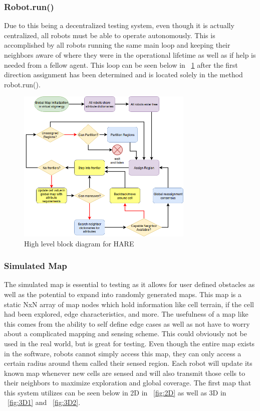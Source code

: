 \subsubsection{Robot.run()}

Due to this being a decentralized testing system, even though it is actually
centralized, all robots must be able to operate autonomously. This is accomplished
by all robots running the same main loop and keeping their neighbors aware of where they were
in the operational lifetime as well as if help is needed from a fellow agent. This loop can be seen
below in ~\ref{fig:HARE} after the first direction assignment has been determined and is
located solely in the method robot.run().


\begin{figure}[H]
  \centering
    \includegraphics[width=0.75\textwidth]{HARE}
  \caption{High level block diagram for HARE}
  \label{fig:HARE}
\end{figure}

\subsubsection{Simulated Map}

The simulated map is essential to testing as it allows for user defined obstacles as well as the
potential to expand into randomly generated maps. This map is a static NxN array of map nodes which
hold information like cell terrain, if the cell had been explored, edge characteristics, and more.
The usefulness of a map like this comes from the ability to self define edge cases as well as not
have to worry about a complicated mapping and sensing scheme. This could obviously not be used
in the real world, but is great for testing. Even though the entire map exists in the software,
robots cannot simply access this map, they can only access a certain radius around them called their
sensed region. Each robot will update its known map whenever new cells are sensed and will also
transmit those cells to their neighbors to maximize exploration and global coverage. The first map
that this system utilizes can be seen below in 2D in ~\ref{fig:2D} as well as 3D in ~\ref{fig:3D1}
and ~\ref{fig:3D2}.

